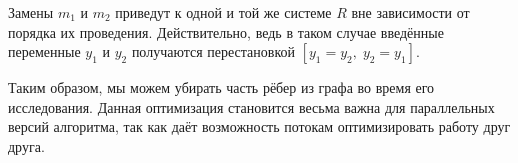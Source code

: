 \begin{proposition}
    Замены $m_1$ и $m_2$ приведут к одной и той же системе $R$ вне зависимости от порядка их проведения. Действительно, ведь в таком случае введённые переменные $y_1$ и $y_2$ получаются перестановкой $[y_1 = y_2,\; y_2 = y_1]$.
\end{proposition}

Таким образом, мы можем убирать часть рёбер из графа во время его исследования. Данная оптимизация становится весьма важна для параллельных версий алгоритма, так как даёт возможность потокам оптимизировать работу друг друга.



